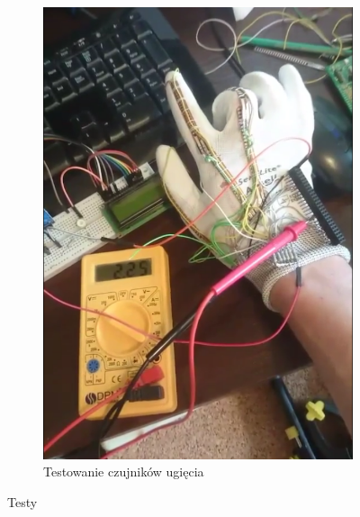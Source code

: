 \documentclass[12pt,a4paper]{article}
\begin{document}
\begin{figure}[h]
\begin{subfigure}{.5\textwidth}
	\includegraphics[width=.9\textwidth]{images/ugiecie.png}
	\caption{Testowanie czujników ugięcia}
	\label{fig:ugiecie}
\end{subfigure}
\caption{Testy}
\label{fig:testy}
\end{figure}
\end{document}
